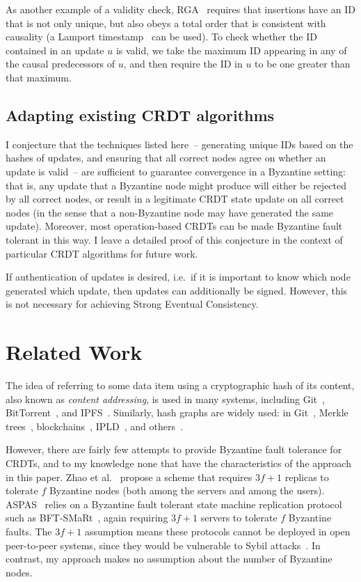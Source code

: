 \documentclass[sigplan,review]{acmart}
\begin{document}
As another example of a validity check, RGA~\cite{Roh:2011} requires that insertions have an ID that is not only unique, but also obeys a total order that is consistent with causality (a Lamport timestamp~\cite{Lamport:1978} can be used).
To check whether the ID contained in an update $u$ is valid, we take the maximum ID appearing in any of the causal predecessors of $u$, and then require the ID in $u$ to be one greater than that maximum.

\subsection{Adapting existing CRDT algorithms}

I conjecture that the techniques listed here~-- generating unique IDs based on the hashes of updates, and ensuring that all correct nodes agree on whether an update is valid~-- are sufficient to guarantee convergence in a Byzantine setting: that is, any update that a Byzantine node might produce will either be rejected by all correct nodes, or result in a legitimate CRDT state update on all correct nodes (in the sense that a non-Byzantine node may have generated the same update).
Moreover, most operation-based CRDTs can be made Byzantine fault tolerant in this way.
I leave a detailed proof of this conjecture in the context of particular CRDT algorithms for future work.

If authentication of updates is desired, i.e.\ if it is important to know which node generated which update, then updates can additionally be signed.
However, this is not necessary for achieving Strong Eventual Consistency.

\section{Related Work}\label{sec:relwork}

The idea of referring to some data item using a cryptographic hash of its content, also known as \emph{content addressing}, is used in many systems, including Git~\cite{ProGit}, BitTorrent~\cite{Pouwelse:2005}, and IPFS~\cite{Benet:2014}.
Similarly, hash graphs are widely used: in Git~\cite{ProGit}, Merkle trees~\cite{Merkle:1987}, blockchains~\cite{Baird:2016tq}, IPLD~\cite{IPLD}, and others~\cite{Kang:2003}.

However, there are fairly few attempts to provide Byzantine fault tolerance for CRDTs, and to my knowledge none that have the characteristics of the approach in this paper.
Zhao et al.~\cite{Zhao:2013ie,Zhao:2016,Chai:2014} propose a scheme that requires $3f+1$ replicas to tolerate $f$ Byzantine nodes (both among the servers and among the users).
ASPAS~\cite{Yactine:2021,Shoker:2017} relies on a Byzantine fault tolerant state machine replication protocol such as BFT-SMaRt~\cite{Bessani:2014}, again requiring $3f+1$ servers to tolerate $f$ Byzantine faults.
The $3f+1$ assumption means these protocols cannot be deployed in open peer-to-peer systems, since they would be vulnerable to Sybil attacks~\cite{Douceur:2002}.
In contrast, my approach makes no assumption about the number of Byzantine nodes.
\end{document}
